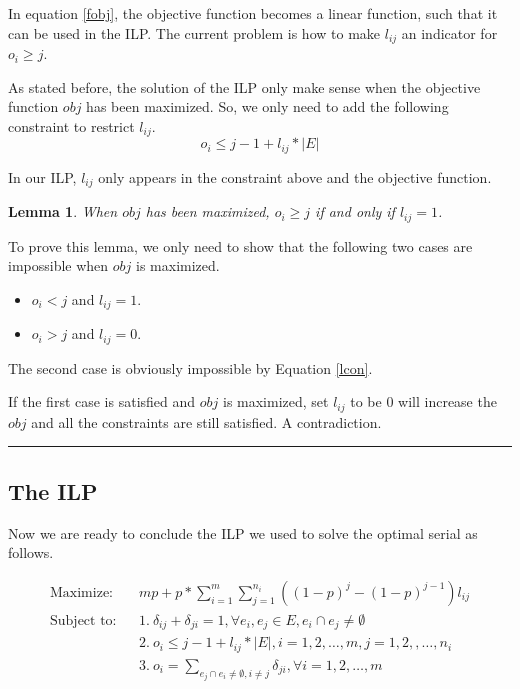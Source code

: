 \documentclass[letterpaper]{article}
\newenvironment{proof}{{Proof:}}{\hfill\rule{2mm}{2mm}}
\newtheorem{lemma}{Lemma}
\begin{document}
In equation \ref{fobj}, the objective function becomes a linear function, such that it can be used in the ILP.
The current problem is how to make $l_{ij}$ an indicator for $o_i\geq j$.

As stated before, the solution of the ILP only make sense when the objective function $obj$ has been maximized.
So, we only need to add the following constraint to restrict $l_{ij}$.
\begin{equation}
o_i\leq j-1+l_{ij}*|E|\label{lcon}
\end{equation}

In our ILP, $l_{ij}$ only appears in the constraint above and the objective function.

\begin{lemma}\label{lmm}
	When $obj$ has been maximized, $o_i\geq j$ if and only if $l_{ij}=1$.
\end{lemma}
\begin{proof}
	To prove this lemma, we only need to show that the following two cases are impossible when $obj$ is maximized.
	\begin{itemize}
		\item $o_i<j$ and $l_{ij}=1$.
		\item $o_i>j$ and $l_{ij}=0$.
	\end{itemize}
	The second case is obviously impossible by Equation \ref{lcon}.
	
	If the first case is satisfied and $obj$ is maximized, set $l_{ij}$ to be 0 will increase the $obj$ and all the constraints are still satisfied. A contradiction.
\end{proof}

\subsection{The ILP}
Now we are ready to conclude the ILP we used to solve the optimal serial as follows.

\begin{eqnarray}
\text{Maximize:}&& mp+p*\sum_{i=1}^{m}\sum_{j=1}^{n_i}((1-p)^j-(1-p)^{j-1})l_{ij}\label{stobj}\\
\text{Subject to:}&& 1.~\delta_{ij}+\delta_{ji}=1, \forall e_i,e_j\in E, e_i\cap e_j\neq \emptyset \label{con1}\\
&& 2.~o_i\leq j-1+l_{ij}*|E|,  i=1,2,\ldots,m, j=1,2,,\ldots,n_i\label{ni}\\
&& 3.~o_i=\sum_{e_j\cap e_i\neq \emptyset,i\neq j}\delta_{ji}, \forall i=1,2,\ldots,m \label{oo}
\end{eqnarray}
\end{document}
